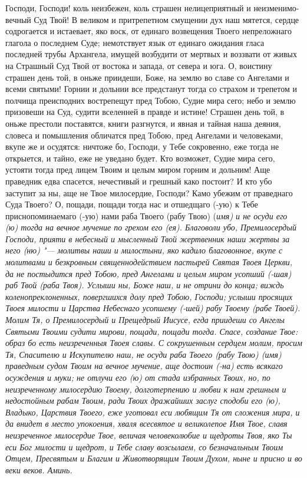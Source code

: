 Господи, Господи! коль неизбежен, коль страшен нелицеприятный и неизменимо-вечный Суд Твой! В великом и притрепетном смущении дух наш мятется, сердце содрогается и истаевает, яко воск, от единаго возвещения Твоего непреложнаго глагола о последнем Суде; немотствует язык от единаго ожидания гласа последней трубы Архангела, имущей возбудити от мертвых и воззвати от живых на Страшный Суд Твой от востока и запада, от севера и юга. О, воистину страшен день той, в оньже приидеши, Боже, на землю во славе со Ангелами и всеми святыми! Горнии и дольнии все предстанут тогда со страхом и трепетом и полчища преисподних вострепещут пред Тобою, Судие мира сего; небо и землю призовеши на Суд, судити вселенней в правде и истине! Страшен день той, в оньже престоли поставятся, книги разгнутся, и явная и тайная наша деяния, словеса и помышления обличатся пред Тобою, пред Ангелами и человеками, вкупе же и осудятся: ничтоже бо, Господи, у Тебе сокровенно, еже тогда не открыется, и тайно, еже не уведано будет. Кто возможет, Судие мира сего, устояти тогда пред лицем Твоим и целым миром горним и дольним! Аще праведник едва спасется, нечестивый и грешный како постоит? И кто убо заступит за ны, аще не Твое милосердие, Господи? Камо убежим от праведнаго Суда Твоего? О, пощади, пощади тогда нас и отшедщаго (-ую) к Тебе приснопоминаемаго (-ую) нами раба Твоего (рабу Твою) (\itshape имя\normalfont{}) и не осуди его (ю) тогда на вечное мучение по грехом его (ея). Благоволи убо, Премилосердый Господи, прияти в небесный и мысленный Твой жертвенник наши жертвы за него (ню) "--- молитвы наши и милостыни, яко кадило благовонное, вкупе с молитвами и безкровным священнодействием пастырей Святая Твоея Церкви, да не постыдится пред Тобою, пред Ангелами и целым миром усопший (-шая) раб Твой (раба Твоя). Услыши ны, Боже наш, и не отрини до конца; виждь коленопреклоненных, повергшихся долу пред Тобою, Господи; услыши просящих Твоея милости и Царства Небеснаго усопшему (-шей) рабу Твоему (рабе Твоей). Молим Тя, о Премилосердый и Прещедрый Иисусе, егда приидеши со Ангелы Святыми Твоими судити мирови, пощади, пощади тогда. Спасе, создание Твое: образ бо есть неизреченныя Твоея славы. С сокрушенным сердцем молим, просим Тя, Спасителю и Искупителю наш, не осуди раба Твоего (рабу Твою) (\itshape имя\normalfont{}) праведным судом Твоим на вечное мучение, аще достоин (-на) есть всякаго осуждения и муки; не отлучи его (ю) от стада избранных Твоих, но, по неизреченному милосердию Твоему, долготерпению и любви к нам грешным и недостойным рабам Твоим, ради Твоих дражайших заслуг сподоби его (ю), Владыко, Царствия Твоего, еже уготовал еси любящим Тя от сложения мира, и да внидет в место упокоения, хваля всесвятое и великолепое Имя Твое, славя неизреченное милосердие Твое, величая человеколюбие и щедроты Твоя, яко Ты еси Бог милости и щедрот, и Тебе славу возсылаем, со безначальным Твоим Отцем, Пресвятым и Благим и Животворящим Твоим Духом, ныне и присно и во веки веков. Аминь. 
\mychapterending

